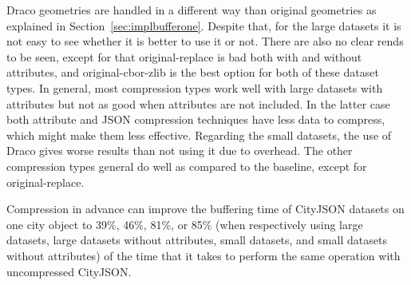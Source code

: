 Draco geometries are handled in a different way than original geometries as explained in Section~\ref{sec:implbufferone}.
Despite that, for the large datasets it is not easy to see whether it is better to use it or not.
There are also no clear rends to be seen, except for that original-replace is bad both with and without attributes, and original-cbor-zlib is the best option for both of these dataset types.
In general, most compression types work well with large datasets with attributes but not as good when attributes are not included.
In the latter case both attribute and JSON compression techniques have less data to compress, which might make them less effective.
Regarding the small datasets, the use of Draco gives worse results than not using it due to overhead.
The other compression types general do well as compared to the baseline, except for original-replace.

Compression in advance can improve the buffering time of CityJSON datasets on one city object to 39\%, 46\%, 81\%, or 85\% (when respectively using large datasets, large datasets without attributes, small datasets, and small datasets without attributes) of the time that it takes to perform the same operation with uncompressed CityJSON.



